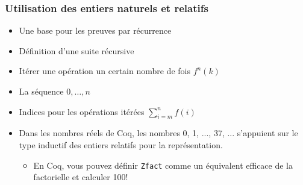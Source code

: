 \documentclass[compress]{beamer}
\begin{document}
\begin{frame}
\frametitle{Utilisation des entiers naturels et relatifs}
\begin{itemize}
\item Une base pour les preuves par r\'ecurrence
\item D\'efinition d'une suite r\'ecursive
\item  It\'erer une op\'eration un certain nombre de fois \(f^n(k)\)
\item  La s\'equence \(0, \ldots, n\)

\item Indices pour les op\'erations it\'er\'ees \(\sum_{i=m}^{n} f(i)\)
\iffalse
\item  Indices pour les collections finies, %
\item Sp\'ecifique \`a Coq+Lean+Agda : formes normales des constructeurs comme cibles de la r\'eduction
\item \fi
\item  Dans les nombres r\'eels de Coq, les nombres 0, 1, ..., 37, ... s'appuient sur le type inductif des entiers relatifs pour la repr\'esentation. 
\begin{itemize}
\item En Coq, vous pouvez d\'efinir {\tt Zfact} comme un \'equivalent efficace de la factorielle et calculer 100!
\end{itemize}
\end{itemize}
\end{frame}
\end{document}

